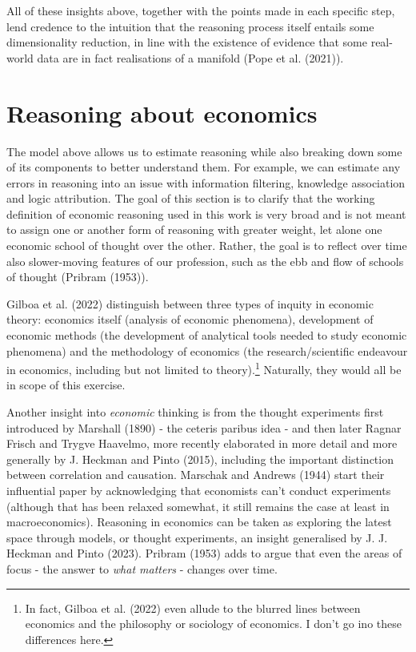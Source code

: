 \documentclass[
]{article}
\begin{document}
All of these insights above, together with the points made in each
specific step, lend credence to the intuition that the reasoning process
itself entails some dimensionality reduction, in line with the existence
of evidence that some real-world data are in fact realisations of a
manifold (Pope et al. (2021)).

\section{Reasoning about economics}\label{reasoning-about-economics}

The model above allows us to estimate reasoning while also breaking down
some of its components to better understand them. For example, we can
estimate any errors in reasoning into an issue with information
filtering, knowledge association and logic attribution. The goal of this
section is to clarify that the working definition of economic reasoning
used in this work is very broad and is not meant to assign one or
another form of reasoning with greater weight, let alone one economic
school of thought over the other. Rather, the goal is to reflect over
time also slower-moving features of our profession, such as the ebb and
flow of schools of thought (Pribram (1953)).

Gilboa et al. (2022) distinguish between three types of inquity in
economic theory: economics itself (analysis of economic phenomena),
development of economic methods (the development of analytical tools
needed to study economic phenomena) and the methodology of economics
(the research/scientific endeavour in economics, including but not
limited to theory).\footnote{In fact, Gilboa et al. (2022) even allude
  to the blurred lines between economics and the philosophy or sociology
  of economics. I don't go ino these differences here.} Naturally, they
would all be in scope of this exercise.

Another insight into \emph{economic} thinking is from the thought
experiments first introduced by Marshall (1890) - the ceteris paribus
idea - and then later Ragnar Frisch and Trygve Haavelmo, more recently
elaborated in more detail and more generally by J. Heckman and Pinto
(2015), including the important distinction between correlation and
causation. Marschak and Andrews (1944) start their influential paper by
acknowledging that economists can't conduct experiments (although that
has been relaxed somewhat, it still remains the case at least in
macroeconomics). Reasoning in economics can be taken as exploring the
latest space through models, or thought experiments, an insight
generalised by J. J. Heckman and Pinto (2023). Pribram (1953) adds to
argue that even the areas of focus - the answer to \emph{what matters} -
changes over time.
\end{document}
